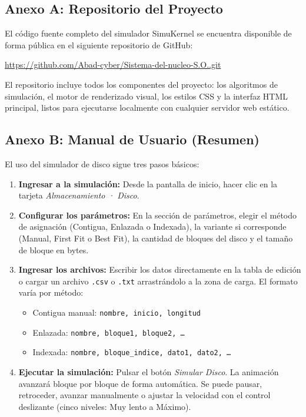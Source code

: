 \documentclass[12pt,a4paper]{article}
\begin{document}
\subsection{Anexo A: Repositorio del Proyecto}

El código fuente completo del simulador SimuKernel se encuentra disponible de forma pública en el siguiente repositorio de GitHub:

\begin{center}
    \url{https://github.com/Abad-cyber/Sistema-del-nucleo-S.O..git}
\end{center}

El repositorio incluye todos los componentes del proyecto: los algoritmos de simulación, el motor de renderizado visual, los estilos CSS y la interfaz HTML principal, listos para ejecutarse localmente con cualquier servidor web estático.

\subsection{Anexo B: Manual de Usuario (Resumen)}

El uso del simulador de disco sigue tres pasos básicos:

\begin{enumerate}
    \item \textbf{Ingresar a la simulación:} Desde la pantalla de inicio, hacer clic en la tarjeta \textit{Almacenamiento · Disco}.
    \item \textbf{Configurar los parámetros:} En la sección de parámetros, elegir el método de asignación (Contigua, Enlazada o Indexada), la variante si corresponde (Manual, First Fit o Best Fit), la cantidad de bloques del disco y el tamaño de bloque en bytes.
    \item \textbf{Ingresar los archivos:} Escribir los datos directamente en la tabla de edición o cargar un archivo \texttt{.csv} o \texttt{.txt} arrastrándolo a la zona de carga. El formato varía por método:
    \begin{itemize}
        \item Contigua manual: \texttt{nombre, inicio, longitud}
        \item Enlazada: \texttt{nombre, bloque1, bloque2, \ldots}
        \item Indexada: \texttt{nombre, bloque\_indice, dato1, dato2, \ldots}
    \end{itemize}
    \item \textbf{Ejecutar la simulación:} Pulsar el botón \textit{Simular Disco}. La animación avanzará bloque por bloque de forma automática. Se puede pausar, retroceder, avanzar manualmente o ajustar la velocidad con el control deslizante (cinco niveles: Muy lento a Máximo).
\end{enumerate}
\end{document}

